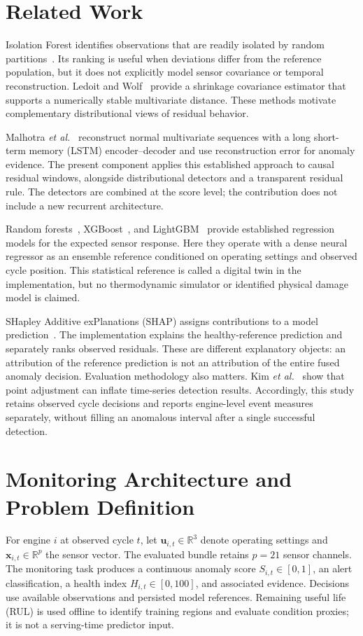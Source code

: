 \documentclass[conference]{IEEEtran}
\begin{document}
\section{Related Work}
Isolation Forest identifies observations that are readily isolated by random partitions~\cite{liu2008}. Its ranking is useful when deviations differ from the reference population, but it does not explicitly model sensor covariance or temporal reconstruction. Ledoit and Wolf~\cite{ledoit2004} provide a shrinkage covariance estimator that supports a numerically stable multivariate distance. These methods motivate complementary distributional views of residual behavior.

Malhotra \emph{et al.}~\cite{malhotra2016} reconstruct normal multivariate sequences with a long short-term memory (LSTM) encoder--decoder and use reconstruction error for anomaly evidence. The present component applies this established approach to causal residual windows, alongside distributional detectors and a transparent residual rule. The detectors are combined at the score level; the contribution does not include a new recurrent architecture.

Random forests~\cite{breiman2001}, XGBoost~\cite{chen2016}, and LightGBM~\cite{ke2017} provide established regression models for the expected sensor response. Here they operate with a dense neural regressor as an ensemble reference conditioned on operating settings and observed cycle position. This statistical reference is called a digital twin in the implementation, but no thermodynamic simulator or identified physical damage model is claimed.

SHapley Additive exPlanations (SHAP) assigns contributions to a model prediction~\cite{lundberg2017}. The implementation explains the healthy-reference prediction and separately ranks observed residuals. These are different explanatory objects: an attribution of the reference prediction is not an attribution of the entire fused anomaly decision. Evaluation methodology also matters. Kim \emph{et al.}~\cite{kim2022} show that point adjustment can inflate time-series detection results. Accordingly, this study retains observed cycle decisions and reports engine-level event measures separately, without filling an anomalous interval after a single successful detection.

\section{Monitoring Architecture and Problem Definition}
For engine $i$ at observed cycle $t$, let $\mathbf{u}_{i,t}\in\mathbb{R}^{3}$ denote operating settings and $\mathbf{x}_{i,t}\in\mathbb{R}^{p}$ the sensor vector. The evaluated bundle retains $p=21$ sensor channels. The monitoring task produces a continuous anomaly score $S_{i,t}\in[0,1]$, an alert classification, a health index $H_{i,t}\in[0,100]$, and associated evidence. Decisions use available observations and persisted model references. Remaining useful life (RUL) is used offline to identify training regions and evaluate condition proxies; it is not a serving-time predictor input.
\end{document}
